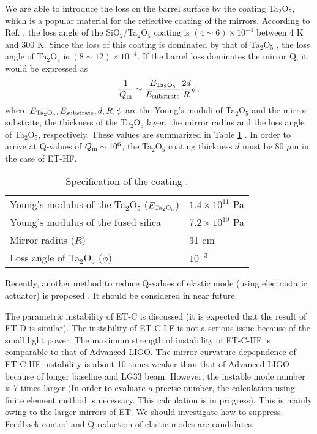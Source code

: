 We are able to introduce the loss on the barrel surface by the
coating Ta$_2$O$_5$, which is a popular material for the
reflective coating of the mirrors. According to Ref.
\cite{Yamamoto2006}, the loss angle of the
SiO$_2$/Ta$_2$O$_5$ coating is $(4 \sim 6) \times 10^{-4}$ between
4 K and 300 K. Since the loss of this coating is dominated by that
of Ta$_2$O$_5$ \cite{Penn2003}, the loss angle of Ta$_2$O$_5$ is $(8
\sim 12) \times 10^{-4}$. If the barrel loss dominates the mirror
Q, it would be expressed as \cite{Yamamoto2002}
\begin{equation}
\frac1{Q_{\rm m}} \sim \frac{E_{{\rm Ta}_2{\rm O}_5}}{E_{\rm substrate}}
\frac{2 d}{R}\phi,
\label{1/Qm}
\end{equation}
where $E_{{\rm Ta}_2{\rm O}_5},E_{\rm substrate}, d, R, \phi$ are
the Young's moduli of Ta$_2$O$_5$ and the mirror substrate, the
thickness of the Ta$_2$O$_5$ layer, the mirror radius and the loss
angle of Ta$_2$O$_5$, respectively. These values are summarized in
Table \ref{tab:coatingspe} \cite{Hild2010a, Yamamoto2006}. In order
to arrive at Q-values of $Q_{\rm m} \sim 10^6$, the Ta$_2$O$_5$ coating
thickness $d$ must be 80 $\mu$m in the case of ET-HF. 
\begin{table}[h]
\begin{center}
\begin{tabular}{ll}
\hline
\hline
Young's modulus of the Ta$_2$O$_5$ ($E_{{\rm Ta}_2{\rm O}_5}$)
&$1.4 \times 10^{11}$ Pa\\
Young's modulus of the fused silica &$7.2 \times 10^{10}$ Pa\\
Mirror radius ($R$)&31 cm\\
Loss angle of Ta$_2$O$_5$ ($\phi$)&$10^{-3}$\\
\hline
\hline
\end{tabular}
\end{center}
\caption{Specification of the coating
\cite{Hild2010a, Yamamoto2006}.\label{tab:coatingspe}}
\end{table}

Recently, another method to reduce Q-values of elastic mode (using electrostatic actuator) is proposed 
\cite{Miller2011}. 
It should be considered in near future. 

{The parametric instability of ET-C is discussed 
(it is expected that the result of ET-D is similar). 
The instability of ET-C-LF is not a serious issue because of the small light power. 
The maximum strength of instability of ET-C-HF is comparable to that of Advanced LIGO. 
The mirror curvature depepndence of ET-C-HF instability is about 10 times 
weaker than that of Advanced LIGO because of longer baseline and LG33 beam.
However, the instable mode number is 7 times larger (In order to evaluate a precise number, 
the calculation using finite element method is necessary. This calculation is in progress). 
This is mainly owing to the larger mirrors of ET.
We should investigate how to suppress. 
Feedback control and Q reduction of elastic modes are candidates.}

